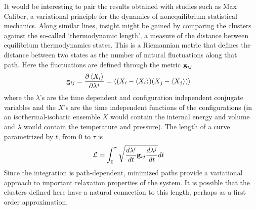 It would be interesting to pair the results obtained with studies such as Max Caliber, a variational principle for the dynamics of nonequilibrium statistical mechanics.\cite{stock_maximum_2008,jaynes_minimum_1980} Along similar lines, insight might be gained by comparing the clusters against the so-called `thermodynamic length', a  measure of the distance between equilibrium thermodynamics states. This is a Riemannian metric that defines the distance between two states as the number of natural fluctuations along that path.\cite{crooks_measuring_2007} Here the fluctuations are defined through the metric ${\bf g}_{ij}$
\begin{equation}
{\bf g}_{ij}  = \frac{\partial \left< X_i \right>}{\partial \lambda^j} = \left< (X_i-\left< X_i \right>)(X_j-\left< X_j \right>) \right>
\end{equation}
where the $\lambda$'s are the time dependent and configuration independent conjugate variables and the $X$'s are the time independent functions of the configurations (\eg in an isothermal-isobaric ensemble $X$ would contain the internal energy and volume and $\lambda$ would contain the temperature and pressure). The length of a curve parametrized by $t$, from $0$ to $\tau$ is
\begin{equation}
\mathcal{L} = \int_0^\tau \sqrt{\frac{d \lambda^i}{dt} {\bf g}_{ij} \frac{d \lambda^j}{dt} } dt
\end{equation}
Since the integration is path-dependent, minimized paths provide a variational approach to important relaxation properties of the system. It is possible that the clusters defined here have a natural connection to this length, perhaps as a first order approximation.
